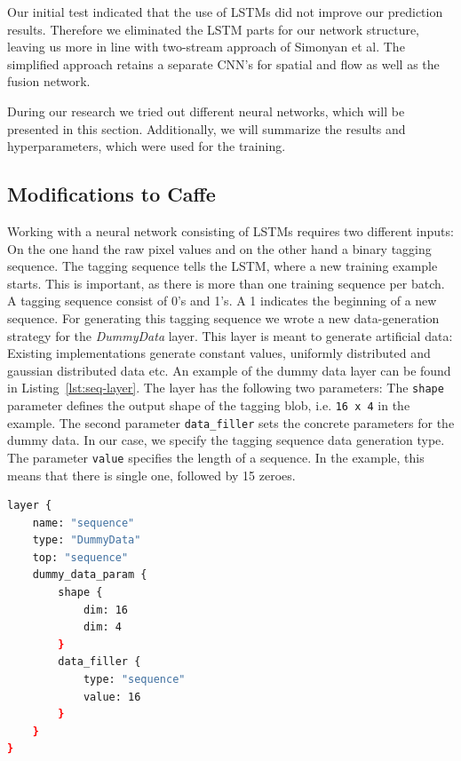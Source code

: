 Our initial test indicated that the use of LSTMs did not improve our prediction results. 
Therefore we eliminated the LSTM parts for our network structure, leaving us more in line with two-stream approach of Simonyan et al\cite{simonyan2014two}.
The simplified approach retains a separate CNN's for spatial and flow as well as the fusion network.

During our research we tried out different neural networks, which will be presented in this section.
Additionally, we will summarize the results and hyperparameters, which were used for the training.

\subsection{Modifications to Caffe}

Working with a neural network consisting of LSTMs requires two different inputs:
On the one hand the raw pixel values and on the other hand a binary tagging sequence.
The tagging sequence tells the LSTM, where a new training example starts.
This is important, as there is more than one training sequence per batch.
A tagging sequence consist of 0's and 1's.
A 1 indicates the beginning of a new sequence.
For generating this tagging sequence we wrote a new data-generation strategy for the \emph{DummyData} layer.
This layer is meant to generate artificial data: Existing implementations generate constant values, uniformly distributed and gaussian distributed data etc.
\newline
An example of the dummy data layer can be found in Listing~\ref{lst:seq-layer}.
The layer has the following two parameters:
The \texttt{shape} parameter defines the output shape of the tagging blob, i.e. \texttt{16 x 4} in the example.
The second parameter \texttt{data\_filler} sets the concrete parameters for the dummy data.
In our case, we specify the tagging sequence data generation type.
The parameter \texttt{value} specifies the length of a sequence.
In the example, this means that there is single one, followed by 15 zeroes.

\begin{lstlisting}[language=sh, caption=Sequence Layer, label=lst:seq-layer]
layer {
	name: "sequence"
	type: "DummyData"
	top: "sequence"
	dummy_data_param {
		shape {
			dim: 16
			dim: 4
		}
		data_filler {
			type: "sequence"
			value: 16
		}
	}
}
\end{lstlisting}



